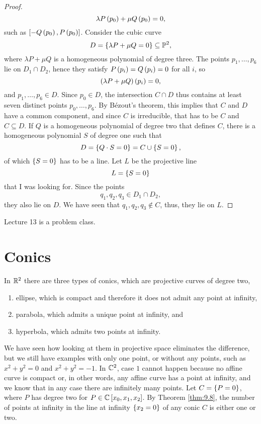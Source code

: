 \begin{proof}
$$ \lambda P\left( p_0 \right) + \mu Q\left( p_0 \right) = 0, $$
such as $ \left[ -Q\left( p_0 \right), P\left( p_0 \right) \right] $. Consider the cubic curve
$$ D = \left\{ \lambda P + \mu Q = 0 \right\} \subseteq \mathbb{P}^2, $$
where $ \lambda P + \mu Q $ is a homogeneous polynomial of degree three. The points $ p_1, \dots, p_6 $ lie on $ D_1 \cap D_2 $, hence they satisfy $ P\left( p_i \right) = Q\left( p_i \right) = 0 $ for all $ i $, so
$$ \left( \lambda P + \mu Q \right)\left( p_i \right) = 0, $$
and $ p_1, \dots, p_6 \in D $. Since $ p_0 \in D $, the intersection $ C \cap D $ thus contains at least seven distinct points $ p_0, \dots, p_6 $. By B\'ezout's theorem, this implies that $ C $ and $ D $ have a common component, and since $ C $ is irreducible, that has to be $ C $ and $ C \subseteq D $. If $ Q $ is a homogeneous polynomial of degree two that defines $ C $, there is a homogeneous polynomial $ S $ of degree one such that
$$ D = \left\{ Q \cdot S = 0 \right\} = C \cup \left\{ S = 0 \right\}, $$
of which $ \left\{ S = 0 \right\} $ has to be a line. Let $ L $ be the projective line
$$ L = \left\{ S = 0 \right\} $$
that I was looking for. Since the points
$$ q_1, q_2, q_3 \in D_1 \cap D_2, $$
they also lie on $ D $. We have seen that $ q_1, q_2, q_3 \notin C $, thus, they lie on $ L $.
\end{proof}


Lecture 13 is a problem class.

\pagebreak

\section{Conics}


In $ \mathbb{R}^2 $ there are three types of conics, which are projective curves of degree two,
\begin{enumerate}
\item ellipse, which is compact and therefore it does not admit any point at infinity,
\item parabola, which admits a unique point at infinity, and
\item hyperbola, which admits two points at infinity.
\end{enumerate}
We have seen how looking at them in projective space eliminates the difference, but we still have examples with only one point, or without any points, such as $ x^2 + y^2 = 0 $ and $ x^2 + y^2 = -1 $. In $ \mathbb{C}^2 $, case $ 1 $ cannot happen because no affine curve is compact or, in other words, any affine curve has a point at infinity, and we know that in any case there are infinitely many points. Let $ C = \left\{ P = 0 \right\} $, where $ P $ has degree two for $ P \in \mathbb{C}\left[ x_0, x_1, x_2 \right] $. By Theorem \ref{thm:9.8}, the number of points at infinity in the line at infinity $ \left\{ x_2 = 0 \right\} $ of any conic $ C $ is either one or two.

